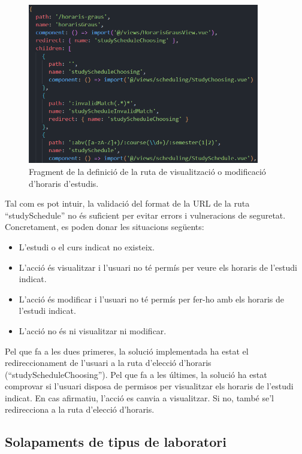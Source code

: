 \documentclass[a4paper,12pt]{ThesisStyle}
\begin{document}
\begin{figure}[H]
  \centering
  \includegraphics[width=0.9\textwidth]{assets/code/enrutamentClient/rutaHoraris.png}
  \caption{\label{img:rutaHoraris} Fragment de la definició de la ruta de visualització o modificació d'horaris d'estudis.}
\end{figure}

Tal com es pot intuir, la validació del format de la URL de la ruta ``studySchedule'' no és suficient per evitar errors i vulneracions de seguretat. Concretament, es poden donar les situacions següents:
\begin{itemize}
  \item L'estudi o el curs indicat no existeix.
  \item L'acció és visualitzar i l'usuari no té permís per veure els horaris de l'estudi indicat.
  \item L'acció és modificar i l'usuari no té permís per fer-ho amb els horaris de l'estudi indicat.
  \item L'acció no és ni visualitzar ni modificar.
\end{itemize}

Pel que fa a les dues primeres, la solució implementada ha estat el redireccionament de l'usuari a la ruta d'elecció d'horaris (``studyScheduleChoosing''). Pel que fa a les últimes, la solució ha estat comprovar si l'usuari disposa de permisos per visualitzar els horaris de l'estudi indicat. En cas afirmatiu, l'acció es canvia a visualitzar. Si no, també se'l redirecciona a la ruta d'elecció d'horaris.

\subsection{Solapaments de tipus de laboratori}
\label{subsec:solapaments_lab}
\end{document}
